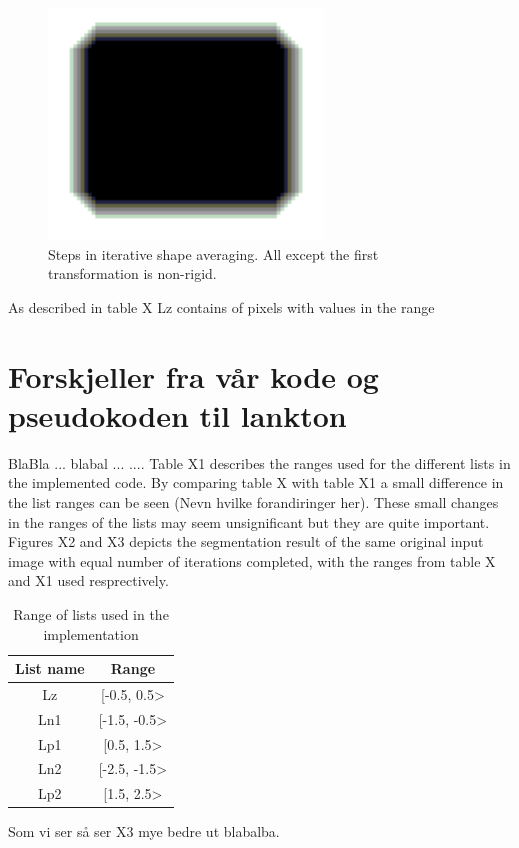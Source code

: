 \begin{figure}[h]
\centering
\includegraphics[width=0.65\textwidth]{sparseFieldCode/labelExample}
\caption{Steps in iterative shape averaging. All except the first transformation is non-rigid.}
\label{labelExample}
\end{figure}


As described in table X Lz contains of pixels with values in the range

\section{Forskjeller fra vår kode og pseudokoden til lankton}
BlaBla ...   blabal ... .... Table X1 describes the ranges used for the different lists in the implemented code. By comparing table X with table X1 a small difference in the list ranges can be seen (Nevn hvilke forandiringer her). These small changes in the ranges of the lists may seem unsignificant but they are quite important. Figures X2 and X3 depicts the segmentation result of the same original input image with equal number of iterations completed, with the ranges from table X and X1 used resprectively.

\begin{table}[h] %
	\begin{tabular}{| c | c |} 
	\hline
	List name & Range\\
	\hline
	Lz & [-0.5, 0.5>\\
	Ln1 & [-1.5, -0.5>\\
	Lp1 & [0.5, 1.5>\\
	Ln2 & [-2.5, -1.5>\\
	Lp2 & [1.5, 2.5>\\
	\hline
	\end{tabular}
	\caption{Range of lists used in the implementation}
	\label{rangeTab2}
\end{table}
Som vi ser så ser X3 mye bedre ut blabalba. 


